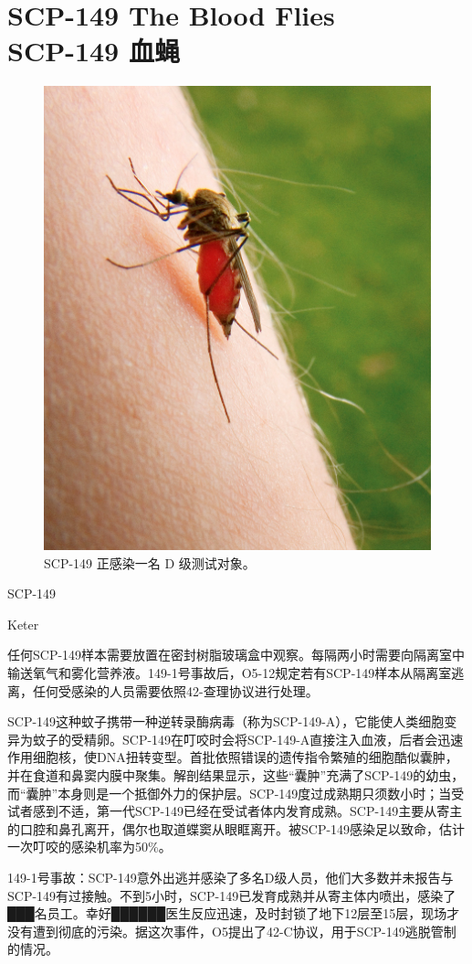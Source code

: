 \chapter[SCP-149 血蝇]{
    SCP-149 The Blood Flies\\
    SCP-149 血蝇
}

\label{chap:SCP-149}

\begin{figure}[H]
    \centering
    \includegraphics[width=0.5\linewidth]{images/SCP-149.jpg}
    \caption*{SCP-149 正感染一名 D 级测试对象。}
\end{figure}

SCP-149

Keter

任何SCP-149样本需要放置在密封树脂玻璃盒中观察。每隔两小时需要向隔离室中输送氧气和雾化营养液。149-1号事故后，O5-12规定若有SCP-149样本从隔离室逃离，任何受感染的人员需要依照42-查理协议进行处理。

SCP-149这种蚊子携带一种逆转录酶病毒（称为SCP-149-A），它能使人类细胞变异为蚊子的受精卵。SCP-149在叮咬时会将SCP-149-A直接注入血液，后者会迅速作用细胞核，使DNA扭转变型。首批依照错误的遗传指令繁殖的细胞酷似囊肿，并在食道和鼻窦内膜中聚集。解剖结果显示，这些“囊肿”充满了SCP-149的幼虫，而“囊肿”本身则是一个抵御外力的保护层。SCP-149度过成熟期只须数小时；当受试者感到不适，第一代SCP-149已经在受试者体内发育成熟。SCP-149主要从寄主的口腔和鼻孔离开，偶尔也取道蝶窦从眼眶离开。被SCP-149感染足以致命，估计一次叮咬的感染机率为50\%。


149-1号事故：SCP-149意外出逃并感染了多名D级人员，他们大多数并未报告与SCP-149有过接触。不到5小时，SCP-149已发育成熟并从寄主体内喷出，感染了███名员工。幸好██████医生反应迅速，及时封锁了地下12层至15层，现场才没有遭到彻底的污染。据这次事件，O5提出了42-C协议，用于SCP-149逃脱管制的情况。
